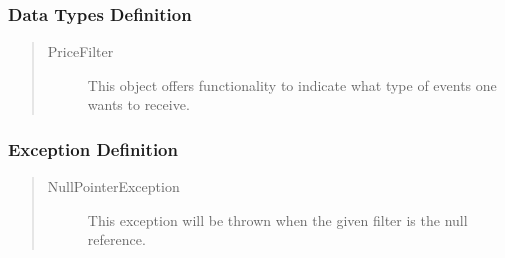 \subsubsection{Data Types Definition}

\begin{quote}
	\begin{description}
		\item[PriceFilter] This object offers functionality to indicate what
		type of events one wants to receive.
	\end{description} 
\end{quote}

\subsubsection{Exception Definition} 

\begin{quote}
	\begin{description}
		\item[NullPointerException] This exception will be thrown when the given
		filter is the null reference.
	\end{description} 
\end{quote}

